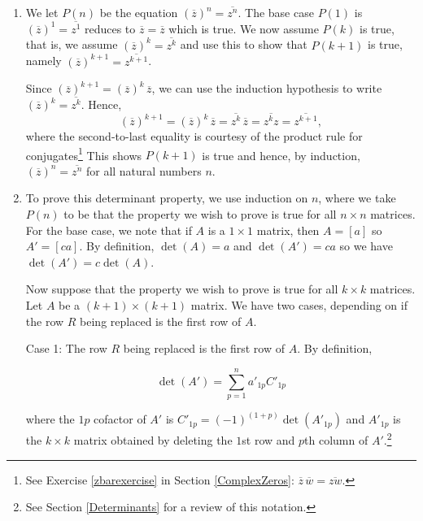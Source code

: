 \documentclass{ximera}
\begin{document}
\begin{example}
\begin{enumerate}
We leave it  to the reader to show that, indeed, \[\frac{k}{2}(2a + (k-1)d) + a + kd = \frac{k+1}{2}(2a+d),\] which completes the proof that $P(k+1)$ is true.  By induction, $\displaystyle{\sum_{j=1}^{n} (a + (j-1)d) = \frac{n}{2}(2a + (n-1)d)}$ for all natural numbers $n$.

\item  We let $P(n)$ be the equation $\left(\overline{z}\right)^n = \overline{z^{n}}$.  The base case $P(1)$ is $\left(\overline{z}\right)^1 = \overline{z^{1}}$ reduces to $\overline{z} = \overline{z}$ which is true.  We now assume $P(k)$ is true, that is, we assume $\left(\overline{z}\right)^k = \overline{z^{k}}$ and use this to show that $P(k+1)$ is true, namely  $\left(\overline{z}\right)^{k+1} = \overline{z^{k+1}}$.  

 

Since $\left(\overline{z}\right)^{k+1} = \left(\overline{z}\right)^{k} \, \overline{z}$, we can use the induction hypothesis to write $\left(\overline{z}\right)^k = \overline{z^{k}}$.  Hence,  \[\left(\overline{z}\right)^{k+1} = \left(\overline{z}\right)^{k} \, \overline{z} =  \overline{z^{k}} \, \overline{z} = \overline{z^{k} z} = \overline{z^{k+1}}, \]  where the second-to-last equality is courtesy of the product rule for conjugates\footnote{See Exercise \ref{zbarexercise} in Section \ref{ComplexZeros}:  $\overline{z} \, \overline{w} = \overline{zw}$.}  This shows $P(k+1)$ is true and hence, by induction, $\left(\overline{z}\right)^n = \overline{z^{n}}$ for all natural numbers $n$.

\item  To prove this determinant property, we use induction on $n$, where we take $P(n)$ to be that the property we wish to prove is true for all $n \times n$ matrices. For the base case, we note that if $A$ is a $1 \times 1$ matrix, then $A = [a]$ so $A' = [ca]$.  By definition, $\det(A) = a$ and $\det(A') = ca$ so we have $\det(A') = c \det(A)$.

 

Now suppose that the property we wish to prove is true for all $k \times k$ matrices.  Let $A$ be a $(k+1) \times (k+1)$ matrix.  We have two cases, depending on if the row $R$ being replaced is the first row of $A$.  

{ \sc Case 1: } The row $R$ being replaced is the first row of $A$. By definition,

\[ \det(A') = \displaystyle{\sum_{p=1}^{n} a'_{1p} C'_{1p}}\]

where the $1p$ cofactor of $A'$ is $C'_{1p} = (-1)^{(1+p)} \det\left(A'_{1p}\right)$ and $A'_{1p}$ is the $k \times k$ matrix obtained by deleting the $1$st row and $p$th column of $A'$.\footnote{See Section \ref{Determinants} for a review of this notation.} 


\end{enumerate}
\end{example}
\end{document}
